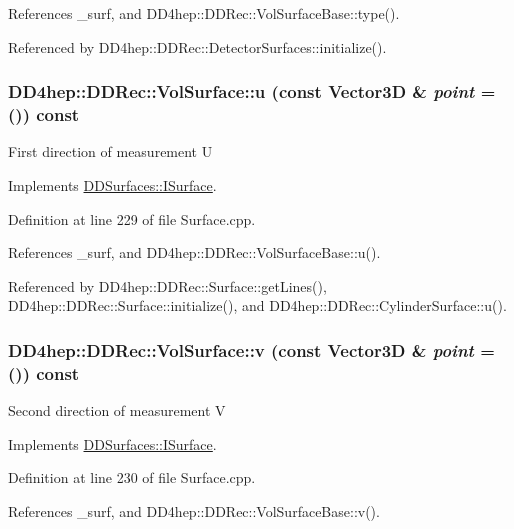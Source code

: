 References \_\-surf, and DD4hep::DDRec::VolSurfaceBase::type().

Referenced by DD4hep::DDRec::DetectorSurfaces::initialize().\hypertarget{class_d_d4hep_1_1_d_d_rec_1_1_vol_surface_a6a23fdeba39bcffea350b53dcac8b3d0}{
\subsubsection[{u}]{ DD4hep::DDRec::VolSurface::u (const {\bf Vector3D} \& {\em point} = {()}) const}}
\label{class_d_d4hep_1_1_d_d_rec_1_1_vol_surface_a6a23fdeba39bcffea350b53dcac8b3d0}
First direction of measurement U 

Implements \hyperlink{class_d_d_surfaces_1_1_i_surface_a09fd4aa43cc96d50b4b81b94107f7d8f}{DDSurfaces::ISurface}.

Definition at line 229 of file Surface.cpp.

References \_\-surf, and DD4hep::DDRec::VolSurfaceBase::u().

Referenced by DD4hep::DDRec::Surface::getLines(), DD4hep::DDRec::Surface::initialize(), and DD4hep::DDRec::CylinderSurface::u().\hypertarget{class_d_d4hep_1_1_d_d_rec_1_1_vol_surface_a46cb5a2e9e28ec469657b7331a83b0ed}{
\subsubsection[{v}]{ DD4hep::DDRec::VolSurface::v (const {\bf Vector3D} \& {\em point} = {()}) const}}
\label{class_d_d4hep_1_1_d_d_rec_1_1_vol_surface_a46cb5a2e9e28ec469657b7331a83b0ed}
Second direction of measurement V 

Implements \hyperlink{class_d_d_surfaces_1_1_i_surface_a61c9f2057ea0383b39ead13a147b2838}{DDSurfaces::ISurface}.

Definition at line 230 of file Surface.cpp.

References \_\-surf, and DD4hep::DDRec::VolSurfaceBase::v().

